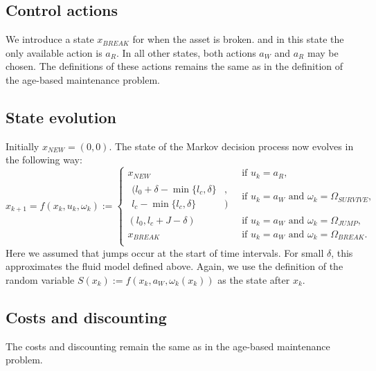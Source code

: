 \documentclass[a4paper]{thesis}
\theoremstyle{definition}
\begin{document}
\subsection{Control actions}
We introduce a state $x_{BREAK}$ for when the asset is broken.
and in this state the only available action is $a_R$.
In all other states, both actions $a_W$ and $a_R$ may be chosen.
The definitions of these actions remains the same as in the definition of the age-based maintenance problem.

\subsection{State evolution}
Initially $x_{NEW}=(0,0)$.
The state of the Markov decision process now evolves in the following way:
\[
x_{k+1}=f(x_k, u_k, \omega_k):=\begin{cases}
x_{NEW}&\ \text{if }u_k=a_R,\\
\begin{split}(l_0+\delta-\min\{l_c,\delta\}&,\\l_c-\min\{l_c,\delta\}&)\end{split}&\ \text{if }u_k=a_W\text{ and }\omega_k=\Omega_{SURVIVE},\\
(l_0,l_c+J-\delta)&\ \text{if }u_k=a_W\text{ and }\omega_k=\Omega_{JUMP},\\
x_{BREAK}&\ \text{if }u_k=a_W\text{ and }\omega_k=\Omega_{BREAK}.\\
\end{cases}
\]
Here we assumed that jumps occur at the start of time intervals.
For small $\delta$, this approximates the fluid model defined above.
Again, we use the definition of the random variable $S(x_k):=f(x_k,a_W,\omega_k(x_k))$ as the state after $x_k$.

\subsection{Costs and discounting}
The costs and discounting remain the same as in the age-based maintenance problem.
\end{document}
